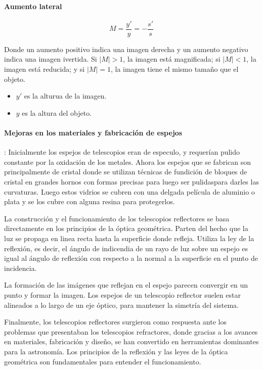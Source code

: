 \paragraph{Aumento lateral} 
\begin{equation}
	M = \frac{y'}{y} = -\frac{s'}{s}
	\label{eq:aumento_lateral}
\end{equation}

Donde un aumento positivo indica una imagen derecha y un aumento negativo indica una imagen ivertida. Si $|M| > 1$, la imagen está magnificada; si $|M| < 1$, la imagen está reducida; y si $|M| = 1$, la imagen tiene el mismo tamaño que el objeto.
\begin{itemize}
	\item $y'$ es la alturua de la imagen.
	\item $y$ es la altura del objeto.
\end{itemize}

\paragraph{Mejoras en los materiales y fabricación de espejos}: Inicialmente los espejos de telescopios eran de especulo, y requerían pulido constante por la oxidación de los metales. Ahora los espejos que se fabrican son principalmente de cristal donde se utilizan técnicas de fundición de bloques de cristal en grandes hornos con formas precisas para luego ser pulidaspara darles las curvaturas. Luego estos vidrios se cubren con una delgada película de aluminio o plata y se los cubre con alguna resina para protegerlos. 

La construcción y el funcionamiento de los telescopios reflectores se basa directamente en los principios de la óptica geométrica. Parten del hecho que la luz se propaga en linea recta hasta la superficie donde refleja. Utiliza la ley de la reflexión, es decir, el ángulo de indicendia de un rayo de luz sobre un espejo es igual al ángulo de reflexión con respecto a la normal a la superficie en el punto de incidencia.

La formación de las imágenes que reflejan en el espejo parecen convergir en un punto y formar la imagen. Los espejos de un telescopio reflector suelen estar alineados a lo largo de un eje óptico, para mantener la simetría del sistema. 

Finalmente, los telescopios reflectores surgieron como respuesta ante los problemas que presentaban los telescopios refractores, donde gracias a los avances en materiales, fabricación y diseño, se han convertido en herramientas dominantes para la astronomía. Los principios de la reflexión y las leyes de la óptica geométrica son fundamentales para entender el funcionamiento. 





